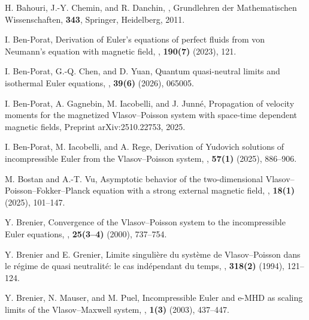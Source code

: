 \documentclass[11pt,reqno]{amsart}
\numberwithin{equation}{section}
\begin{document}
\bigskip
\medskip
\begin{thebibliography}{}

H. Bahouri, J.-Y. Chemin, and R. Danchin,
,
\newblock Grundlehren der Mathematischen Wissenschaften, {\bf 343}, Springer, Heidelberg, 2011.

I. Ben-Porat,
\newblock Derivation of Euler's equations of perfect fluids from von Neumann's equation with magnetic field,
, {\bf 190(7)} (2023), 121.

I. Ben-Porat, G.-Q. Chen, and D. Yuan,
\newblock Quantum quasi-neutral limits and isothermal Euler equations,
, {\bf 39(6)} (2026), 065005.

I. Ben-Porat, A. Gagnebin, M. Iacobelli, and J. Junn{\'e},
\newblock Propagation of velocity moments for the magnetized Vlasov--Poisson system with space-time dependent magnetic fields,
\newblock Preprint arXiv:2510.22753, 2025.

I. Ben-Porat, M. Iacobelli, and A. Rege,
\newblock Derivation of Yudovich solutions of incompressible Euler from the Vlasov--Poisson system,
, {\bf 57(1)} (2025), 886--906.

M. Bostan and A.-T. Vu,
\newblock Asymptotic behavior of the two-dimensional Vlasov--Poisson--Fokker--Planck equation with a strong external magnetic field,
, {\bf 18(1)} (2025), 101--147.

Y. Brenier,
\newblock Convergence of the Vlasov--Poisson system to the incompressible Euler equations,
, {\bf 25(3--4)} (2000), 737--754.

Y. Brenier and E. Grenier,
\newblock Limite singuli{\`e}re du syst{\`e}me de Vlasov--Poisson dans le r{\'e}gime de quasi neutralit{\'e}: le cas ind{\'e}pendant du temps,
, {\bf 318(2)} (1994), 121--124.

Y. Brenier, N. Mauser, and M. Puel,
\newblock Incompressible Euler and e-MHD as scaling limits of the Vlasov--Maxwell system,
, {\bf 1(3)} (2003), 437--447.


\end{thebibliography}
\end{document}
